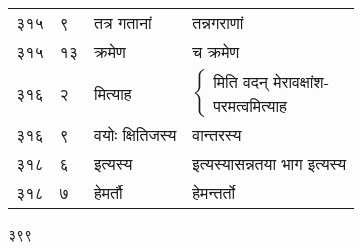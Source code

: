 \documentclass[11pt, openany]{book}
\begin{document}
\begin{longtable}{p{1cm} p{1.5cm} p{4cm} p{4cm}}
 ३१५ & ९ & तत्र गतानां & तन्नगराणां \\

 ३१५ & १३ & क्रमेण & च क्रमेण \\

 ३१६ & २ & मित्याह & $\begin{cases}\mbox{मिति वदन् मेरावक्षांश-}\\
\mbox{परमत्वमित्याह }\end{cases}$\\

 ३१६ & ९ & वयोः क्षितिजस्य & वान्तरस्य \\

 ३१८ & ६ & इत्यस्य & इत्यस्यासन्नतया भाग इत्यस्य \\

 ३१८ & ७ & हेमर्तौ & हेमन्तर्तो \\
\end{longtable}


\newpage

\begin{center}
 ३९९ 
\end{center}
\end{document}
